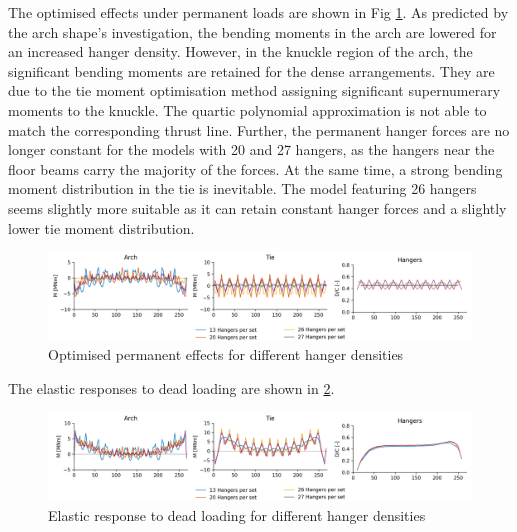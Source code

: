 The optimised effects under permanent loads are shown in Fig \ref{fig:hd_permanent}. As predicted by the arch shape's investigation, the bending moments in the arch are lowered for an increased hanger density. However, in the knuckle region of the arch, the significant bending moments are retained for the dense arrangements. They are due to the tie moment optimisation method assigning significant supernumerary moments to the knuckle. The quartic polynomial approximation is not able to match the corresponding thrust line. Further, the permanent hanger forces are no longer constant for the models with 20 and 27 hangers, as the hangers near the floor beams carry the majority of the forces. At the same time, a strong bending moment distribution in the tie is inevitable. The model featuring 26 hangers seems slightly more suitable as it can retain constant hanger forces and a slightly lower tie moment distribution.

\begin{figure}[H]
    \centering
    \includegraphics[trim={0 0 2cm 0},clip, width=\textwidth]{calculations/hanger density/permanent_plot.png}
    \caption{Optimised permanent effects for different hanger densities}
    \label{fig:hd_permanent}
\end{figure}

The elastic responses to dead loading are shown in \cref{fig:hd_elastic_response_dl}.

\begin{figure}[H]
    \centering
    \includegraphics[trim={0 0 1cm 0},clip, width=\textwidth]{calculations/hanger density/dead loading_plot.png}
    \caption{Elastic response to dead loading for different hanger densities}
    \label{fig:hd_elastic_response_dl}
\end{figure}

